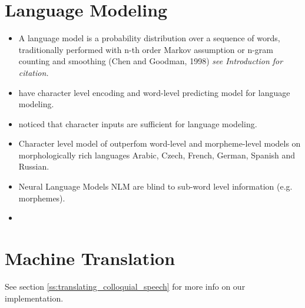 \documentclass[12pt,a4paper,english
]{tutthesis}
\begin{document}
\section{Language Modeling}
\label{se:language_modeling}
\begin{itemize}
\item A language model is a probability distribution over a sequence of words, traditionally performed with n-th order Markov assumption or n-gram counting and smoothing (Chen and Goodman, 1998) \textit{see \cite{Kim2016} Introduction for citation.}
\item \cite{Kim2016} have character level encoding and word-level predicting model for language modeling.
\item \cite{Kim2016} noticed that character inputs are sufficient for language modeling.
\item Character level model of \cite{Kim2016} outperfom word-level and morpheme-level models on morphologically rich languages Arabic, Czech, French, German, Spanish and Russian.
\item Neural Language Models NLM are blind to sub-word level information (e.g. morphemes). \cite{Kim2016}
\item 
\end{itemize}

\section{Machine Translation}
\label{se:machine_translation}
See section \ref{ss:translating_colloquial_speech} for more info on our implementation.
\end{document}
